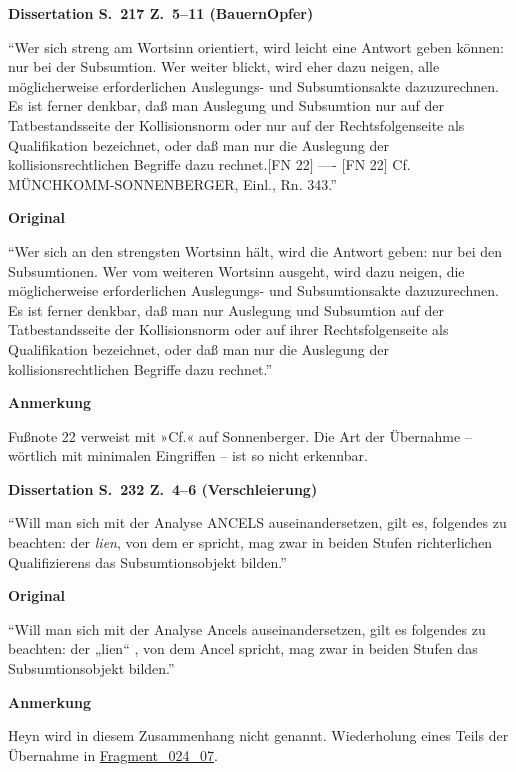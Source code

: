 \documentclass[ngerman,final,fontsize=12pt,paper=a4,twoside,bibliography=totocnumbered,BCOR=8mm,draft=false]{scrartcl}
\newenvironment{fragment}
	{\begin{snugshade}}
	{\end{snugshade}
	 \penalty-200
	 \vskip 0pt plus 10mm minus 5mm}
\newenvironment{fragmentpart}[1]
	{\noindent\textbf{#1}\par\penalty500}
	{\par}
\begin{document}
\hypertarget{Lm-Fragment-217-05}{}
\begin{fragment}
\begin{fragmentpart}{Dissertation S.~217 Z.~5--11 (BauernOpfer)}
\enquote{Wer sich streng am Wortsinn orientiert, wird leicht eine Antwort geben können: nur bei der Subsumtion. Wer weiter blickt, wird eher dazu neigen, alle möglicherweise erforderlichen Auslegungs- und Subsumtionsakte dazuzurechnen. Es ist ferner denkbar, daß man Auslegung und Subsumtion nur auf der Tatbestandsseite der Kollisionsnorm oder nur auf der Rechtsfolgenseite als Qualifikation bezeichnet, oder daß man nur die Auslegung der kollisionsrechtlichen Begriffe dazu rechnet.$[$FN 22$]$
----
$[$FN 22$]$ Cf. MÜNCHKOMM-SONNENBERGER, Einl., Rn. 343.}
\end{fragmentpart}
\begin{fragmentpart}{Original \cite[S.~145 Z.~343]{Sonnenberger-1990}}
\enquote{Wer sich an den strengsten Wortsinn hält, wird die Antwort geben: nur bei den Subsumtionen. Wer vom weiteren Wortsinn ausgeht, wird dazu neigen, die möglicherweise erforderlichen Auslegungs- und Subsumtionsakte dazuzurechnen. Es ist ferner denkbar, daß man nur Auslegung und Subsumtion auf der Tatbestandsseite der Kollisionsnorm oder auf ihrer Rechtsfolgenseite als Qualifikation bezeichnet, oder daß man nur die Auslegung der kollisionsrechtlichen Begriffe dazu rechnet.}
\end{fragmentpart}
\begin{fragmentpart}{Anmerkung}
Fußnote 22 verweist mit »Cf.« auf Sonnenberger. Die Art der Übernahme – wörtlich mit minimalen Eingriffen – ist so nicht erkennbar.
\end{fragmentpart}
\end{fragment}
\hypertarget{Lm-Fragment-232-04}{}
\begin{fragment}
\begin{fragmentpart}{Dissertation S.~232 Z.~4--6 (Verschleierung)}
\enquote{Will man sich mit der Analyse ANCELS auseinandersetzen, gilt es, folgendes zu beachten: der \textsl{lien}, von dem er spricht, mag zwar in beiden Stufen richterlichen Qualifizierens das Subsumtionsobjekt bilden.}
\end{fragmentpart}
\begin{fragmentpart}{Original \cite[S.~29 Z.~28--30]{Heyn-1986}}
\enquote{Will man sich mit der Analyse Ancels auseinandersetzen, gilt es folgendes zu beachten: der „lien“ , von dem Ancel spricht, mag zwar in beiden Stufen das Subsumtionsobjekt bilden.}
\end{fragmentpart}
\begin{fragmentpart}{Anmerkung}
Heyn wird in diesem Zusammenhang nicht genannt. Wiederholung eines Teils der Übernahme in \hyperlink{Lm-Fragment-024-07}{Fragment\_024\_07}.
\end{fragmentpart}
\end{fragment}
\end{document}
